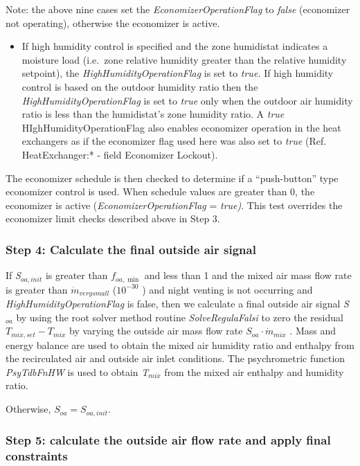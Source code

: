 Note: the above nine cases set the \emph{EconomizerOperationFlag} to \emph{false} (economizer not operating), otherwise the economizer is active.

\begin{itemize}
\item If high humidity control is specified and the zone humidistat indicates a moisture load (i.e.~zone relative humidity greater than the relative humidity setpoint), the \emph{HighHumidityOperationFlag} is set to \emph{true.} If high humidity control is based on the outdoor humidity ratio then the \emph{HighHumidityOperationFlag} is set to \emph{true} only when the outdoor air humidity ratio is less than the humidistat's zone humidity ratio. A \emph{true} HIghHumidityOperationFlag also enables economizer operation in the heat exchangers as if the economizer flag used here was also set to \emph{true} (Ref. HeatExchanger:* - field Economizer Lockout).
\end{itemize}

The economizer schedule is then checked to determine if a ``push-button'' type economizer control is used. When schedule values are greater than 0, the economizer is active (\emph{EconomizerOperationFlag} = \emph{true)}. This test overrides the economizer limit checks described above in Step 3.

\subsubsection{Step 4: Calculate the final outside air signal}\label{step-4-Calculate-the-final-outside-air-signal}

If \emph{S\(_{oa,init}\)} is greater than \({f_{oa,\min }}\) and less than 1 and the mixed air mass flow rate is greater than \({\dot m_{verysmall}}\) (\({10^{ - 30}}\) ) and night venting is not occurring and \emph{HighHumidityOperationFlag} is false, then we calculate a final outside air signal \emph{S\(_{oa}\)} by using the root solver method routine \emph{SolveRegulaFalsi} to zero the residual \({T_{mix,set}} - {T_{mix}}\) by varying the outside air mass flow rate \({S_{oa}}\cdot {\dot m_{mix}}\) . Mass and energy balance are used to obtain the mixed air humidity ratio and enthalpy from the recirculated air and outside air inlet conditions. The psychrometric function \emph{PsyTdbFnHW} is used to obtain \emph{T\(_{mix}\)} from the mixed air enthalpy and humidity ratio.

Otherwise, \({S_{oa}} = {S_{oa,init}}\).

\subsubsection{Step 5: calculate the outside air flow rate and apply final constraints}\label{step-5-calculate-the-outside-air-flow-rate-and-apply-final-constraints}

